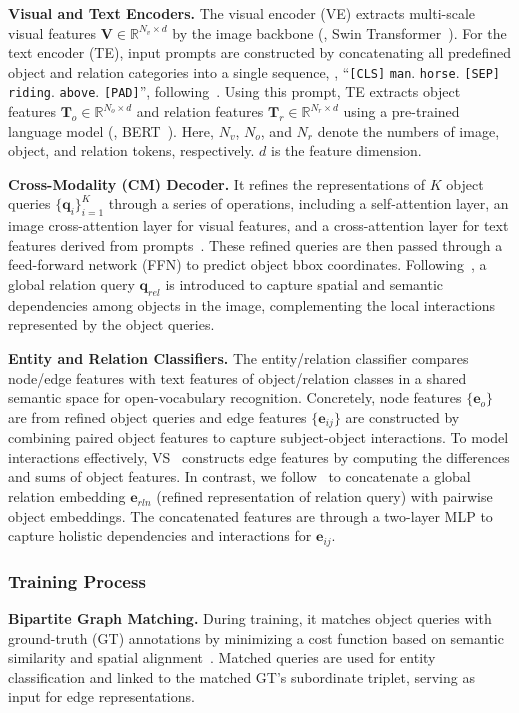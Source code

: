 \textbf{Visual and Text Encoders.}
The visual encoder (VE) extracts multi-scale visual features $\mathbf{V} \in \mathbb{R}^{N_v \times d}$ by the image backbone (\eg, Swin Transformer~\cite{liu2021swin}). For the text encoder (TE), input prompts are constructed by concatenating all predefined object and relation categories into a single sequence, \eg, ``\texttt{[CLS]} \texttt{man}. \texttt{horse}. \texttt{[SEP]} \texttt{riding}. \texttt{above}. \texttt{[PAD]}'', following~\cite{chen2024expanding}. Using this prompt, TE extracts object features $\mathbf{T}_o \in \mathbb{R}^{N_o \times d}$ and relation features $\mathbf{T}_r \in \mathbb{R}^{N_r \times d}$ using a pre-trained language model (\eg, BERT~\cite{kenton2019bert}). Here, $N_v$, $N_o$, and $N_r$ denote the numbers of image, object, and relation tokens, respectively. $d$ is the feature dimension.

\textbf{Cross-Modality (CM) Decoder.}  
It refines the representations of $K$ object queries $\{\mathbf{q}_i\}_{i=1}^K$ through a series of operations, including a self-attention layer, an image cross-attention layer for visual features, and a cross-attention layer for text features derived from prompts~\cite{liu2023grounding}. These refined queries are then passed through a feed-forward network (FFN) to predict object bbox coordinates. Following~\cite{chen2024expanding, shit2022relationformer}, a global relation query $\mathbf{q}_{rel}$ is introduced to capture spatial and semantic dependencies among objects in the image, complementing the local interactions represented by the object queries.

\textbf{Entity and Relation Classifiers.}
The entity/relation classifier compares node/edge features with text features of object/relation classes in a shared semantic space for open-vocabulary recognition. $\!$Concretely, node features $\{\mathbf{e}_o\}$ are from refined object queries and edge features $\{\mathbf{e}_{ij}\}$ are constructed by combining paired object features to capture subject-object interactions. $\!$To model interactions effectively, VS~\cite{zhang2023learning} constructs edge features by computing the differences and sums of object features. In contrast, we follow~\cite{chen2024expanding,shit2022relationformer} to concatenate a global relation embedding $\mathbf{e}_{rln}$ (refined representation of relation query) with pairwise object embeddings. The concatenated features are through a two-layer MLP to capture holistic dependencies and interactions for $\mathbf{e}_{ij}$.

\subsubsection{Training Process}
\label{sec:method_train}
\textbf{Bipartite Graph Matching.}
During training, it matches object queries with ground-truth (GT) annotations by minimizing a cost function based on semantic similarity and spatial alignment~\cite{carion2020end}. Matched queries are used for entity classification and linked to the matched GT's subordinate triplet, serving as input for edge representations.

